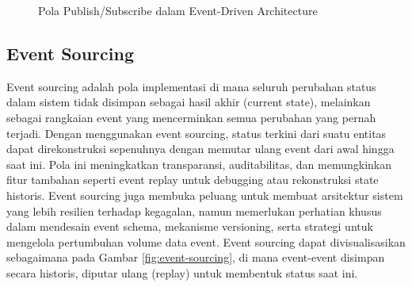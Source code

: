 \begin{figure}[h]
	\centering
	\caption{Pola Publish/Subscribe dalam Event-Driven Architecture}
	\label{fig:publish-subscribe}
\end{figure}


\subsection{Event Sourcing}
Event sourcing adalah pola implementasi di mana seluruh perubahan status dalam sistem tidak disimpan sebagai hasil akhir (current state), melainkan sebagai rangkaian event yang mencerminkan semua perubahan yang pernah terjadi. Dengan menggunakan event sourcing, status terkini dari suatu entitas dapat direkonstruksi sepenuhnya dengan memutar ulang event dari awal hingga saat ini. Pola ini meningkatkan transparansi, auditabilitas, dan memungkinkan fitur tambahan seperti event replay untuk debugging atau rekonstruksi state historis. Event sourcing juga membuka peluang untuk membuat arsitektur sistem yang lebih resilien terhadap kegagalan, namun memerlukan perhatian khusus dalam mendesain event schema, mekanisme versioning, serta strategi untuk mengelola pertumbuhan volume data event. Event sourcing dapat divisualisasikan sebagaimana pada Gambar \ref{fig:event-sourcing}, di mana event-event disimpan secara historis, diputar ulang (replay) untuk membentuk status saat ini.

